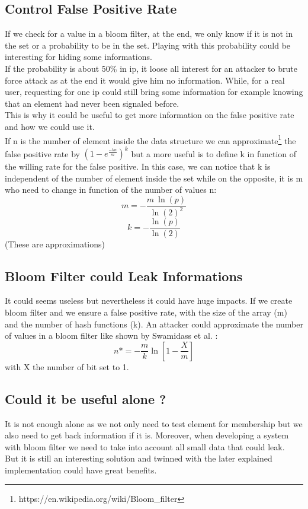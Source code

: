 \documentclass{eplmastersthesis}
\begin{document}
\subsection{Control False Positive Rate}
If we check for a value in a bloom filter, at the end, we only know if it is not in the set or a probability to be in the set. Playing with this probability could be interesting for hiding some informations. \\
If the probability is about 50\% in ip, it loose all interest for an attacker to brute force attack as at the end it would give him no information. While, for a real user, requesting for one ip could still bring some information for example knowing that an element had never been signaled before.\\
This is why it could be useful to get more information on the false positive rate and how we could use it.\\

If n is the number of element inside the data structure we can approximate\footnote{https://en.wikipedia.org/wiki/Bloom\_filter} the false positive rate by $(1-e^{\frac{-kn}{m}})^k$ but a more useful is to define k in function of the willing rate for the false positive. In this case, we can notice that k is independent of the number of element inside the set while on the opposite, it is m who need to change in function of the number of values n:
$$m = - \frac{m\ \ln(p)}{\ln(2)^2}$$
$$k = - \frac{\ln(p)}{\ln(2)}$$
(These are approximations)

\subsection{Bloom Filter could Leak Informations}
It could seems useless but nevertheless it could have huge impacts. If we create bloom filter and we ensure a false positive rate, with the size of the array (m) and the number of hash functions (k). An attacker could approximate the number of values in a bloom filter like shown by Swamidass et al. \cite{swamidass2007mathematical}:
$$n* = - \frac{m}{k} \ln\left[1 - \frac{X}{m}\right] $$
with X the number of bit set to 1.

\subsection{Could it be useful alone ?}
It is not enough alone as we not only need to test element for membership but we also need to get back information if it is. Moreover, when developing a system with bloom filter we need to take into account all small data that could leak. \\
But it is still an interesting solution and twinned with the later explained implementation could have great benefits.
\end{document}
